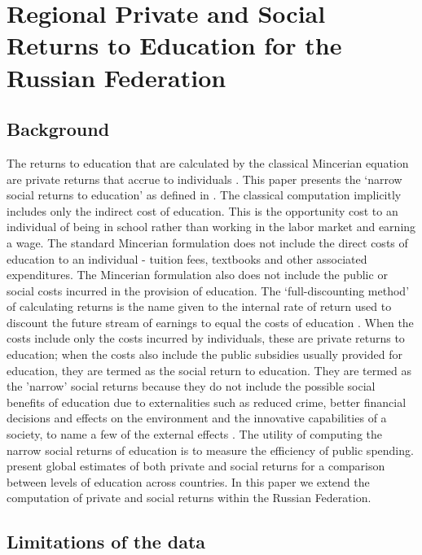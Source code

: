 \documentclass[alpha-refs]{wiley-article-05g}
\begin{document}
\vspace{-0.2in}

\section{Regional Private and Social Returns to Education for the Russian Federation}

\subsection{Background}

The returns to education that are calculated by the classical Mincerian 
equation are private returns that accrue to individuals 
\parencite{mincer1974}. This paper presents the `narrow social returns to 
education' as defined in \cite{psacharopoulos2019}. The classical 
computation implicitly includes only the indirect cost of education. This 
is the opportunity cost to an individual of being in school rather than 
working in the labor market and earning a wage. The standard Mincerian 
formulation does not include the direct costs of education to an individual 
- tuition fees, textbooks and other associated expenditures. The Mincerian 
formulation also does not include the public or social costs incurred in 
the provision of education. The `full-discounting method' of calculating 
returns is the name given to the internal rate of return used to discount 
the future stream of earnings to equal the costs of education 
\parencite{psacharopoulos1995}. When the costs include only the costs 
incurred by individuals, these are private returns to education; when the 
costs also include the public subsidies usually provided for education, 
they are termed as the social return to education. They are termed as the 
'narrow' social returns because they do not include the possible social 
benefits of education due to externalities such as reduced crime, better 
financial decisions and effects on the environment and the innovative 
capabilities of a society, to name a few of the external effects 
\parencite{wolfe2002,mcmahon2004,owens2004}.  The utility of computing the 
narrow social returns of education is to measure the efficiency of public 
spending. \cite{Psacharopoulos_Patrinos2018} present global estimates of 
both private and social returns for a comparison between levels of 
education across countries. In this paper we extend the computation of 
private and social returns within the Russian Federation. 

\subsection{Limitations of the data} 
\end{document}
